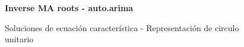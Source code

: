 
\vspace{4mm}	
\begin{figure}[h]
	\centering
	\textbf{Inverse MA roots - auto.arima}\par\medskip
	\caption{Soluciones de ecuación característica - Representación de circulo unitario}\label{fig}
\end{figure}


